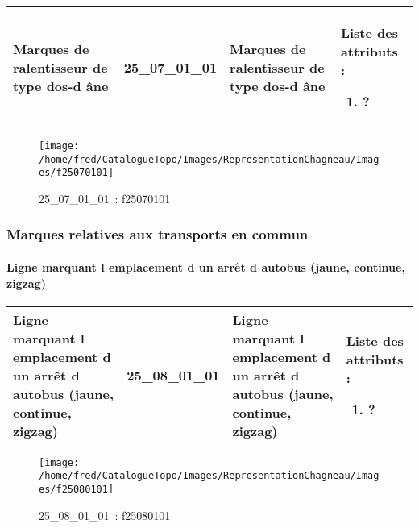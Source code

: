 \documentclass[12pt,titlepage]{book}
\begin{document}
\renewcommand{\arraystretch}{1.2}
\begin{supertabular}{|p{10cm}|c|p{13cm}|p{12cm}|}
 Marques de ralentisseur de type dos-d âne & 25\_07\_01\_01 & Marques de ralentisseur de type dos-d âne & Liste des attributs :
\begin{enumerate}
  \item ?\end{enumerate}
\\
\hline
\end{supertabular}
\begin{figure}[h!]
  \hfill         %
  \begin{minipage}[t]{3cm}
    \begin{center}
      \texttt{[image: /home/fred/CatalogueTopo/Images/RepresentationChagneau/Images/f25070101]}
      \caption[~25\_07\_01\_01]{\small{25\_07\_01\_01~:} \tiny{f25070101}}\label{f25070101}
    \end{center}
  \end{minipage}
\end{figure}

\subsubsection{\large Marques relatives aux transports en commun}
\paragraph{Ligne marquant l emplacement d un arrêt d autobus (jaune, continue, zigzag)}
\noindent
\vspace{\baselineskip}

\renewcommand{\arraystretch}{1.2}
\begin{supertabular}{|p{10cm}|c|p{13cm}|p{12cm}|}
 Ligne marquant l emplacement d un arrêt d autobus (jaune, continue, zigzag) & 25\_08\_01\_01 & Ligne marquant l emplacement d un arrêt d autobus (jaune, continue, zigzag) & Liste des attributs :
\begin{enumerate}
  \item ?\end{enumerate}
\\
\hline
\end{supertabular}
\begin{figure}[h!]
  \hfill         %
  \begin{minipage}[t]{3cm}
    \begin{center}
      \texttt{[image: /home/fred/CatalogueTopo/Images/RepresentationChagneau/Images/f25080101]}
      \caption[~25\_08\_01\_01]{\small{25\_08\_01\_01~:} \tiny{f25080101}}\label{f25080101}
    \end{center}
  \end{minipage}
\end{figure}
\end{document}
